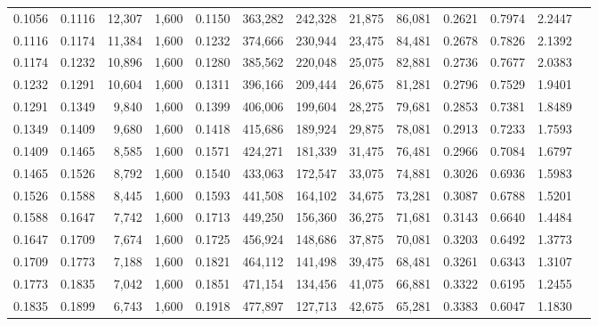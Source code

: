 \begin{tabular}{rrrrrrrrrrrrr}
0.1056 & 0.1116 & 12,307 & 1,600 &                                     0.1150 & 363,282 & 242,328 &  21,875 &  86,081 & 0.2621 & 0.7974 & 2.2447 \\
0.1116 & 0.1174 & 11,384 & 1,600 &                                     0.1232 & 374,666 & 230,944 &  23,475 &  84,481 & 0.2678 & 0.7826 & 2.1392 \\
0.1174 & 0.1232 & 10,896 & 1,600 &                                     0.1280 & 385,562 & 220,048 &  25,075 &  82,881 & 0.2736 & 0.7677 & 2.0383 \\
0.1232 & 0.1291 & 10,604 & 1,600 &                                     0.1311 & 396,166 & 209,444 &  26,675 &  81,281 & 0.2796 & 0.7529 & 1.9401 \\
0.1291 & 0.1349 &  9,840 & 1,600 &                                     0.1399 & 406,006 & 199,604 &  28,275 &  79,681 & 0.2853 & 0.7381 & 1.8489 \\
0.1349 & 0.1409 &  9,680 & 1,600 &                                     0.1418 & 415,686 & 189,924 &  29,875 &  78,081 & 0.2913 & 0.7233 & 1.7593 \\
0.1409 & 0.1465 &  8,585 & 1,600 &                                     0.1571 & 424,271 & 181,339 &  31,475 &  76,481 & 0.2966 & 0.7084 & 1.6797 \\
0.1465 & 0.1526 &  8,792 & 1,600 &                                     0.1540 & 433,063 & 172,547 &  33,075 &  74,881 & 0.3026 & 0.6936 & 1.5983 \\
0.1526 & 0.1588 &  8,445 & 1,600 &                                     0.1593 & 441,508 & 164,102 &  34,675 &  73,281 & 0.3087 & 0.6788 & 1.5201 \\
0.1588 & 0.1647 &  7,742 & 1,600 &                                     0.1713 & 449,250 & 156,360 &  36,275 &  71,681 & 0.3143 & 0.6640 & 1.4484 \\
0.1647 & 0.1709 &  7,674 & 1,600 &                                     0.1725 & 456,924 & 148,686 &  37,875 &  70,081 & 0.3203 & 0.6492 & 1.3773 \\
0.1709 & 0.1773 &  7,188 & 1,600 &                                     0.1821 & 464,112 & 141,498 &  39,475 &  68,481 & 0.3261 & 0.6343 & 1.3107 \\
0.1773 & 0.1835 &  7,042 & 1,600 &                                     0.1851 & 471,154 & 134,456 &  41,075 &  66,881 & 0.3322 & 0.6195 & 1.2455 \\
0.1835 & 0.1899 &  6,743 & 1,600 &                                     0.1918 & 477,897 & 127,713 &  42,675 &  65,281 & 0.3383 & 0.6047 & 1.1830 \\

\end{tabular}
